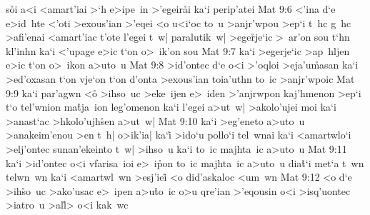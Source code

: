 s\r{o}i
a<i
<amart'iai
>`h
e>ipe~in
>'egeir\r{a}i
ka`i
perip'atei\bibvsend
\vs Mat 9:6
<'ina
d`e
e>id~hte
<'oti
>exous'ian
>'eqei
<o
u<i`oc
to~u
>anjr'wpou
>ep`i
t~hc
g~hc
>afi'enai
<amart'iac
t'ote
l'egei
t~w|
paralutik~w|
>ege\r{r}je`ic
>~ar'on
sou
t`hn
kl'inhn
ka`i
<'upage
e>ic
t`on
o>~ik'on
sou\bibvsend
\vs Mat 9:7
ka`i
>egerje`ic
>ap~hljen
e>ic
t`on
o>~ikon
a>uto~u\bibvsend
\vs Mat 9:8
>id'ontec
d`e
o<i
>'oqloi
>eja'u\r{m}asan
ka`i
>ed'oxasan
t`on
vje`on
t`on
d'onta
>exous'ian
toia'uthn
to~ic
>anjr'wpoic\bibvsend
\vs Mat 9:9
ka`i
par'agwn
<o\r{}
>ihso~uc
>eke~ijen
e>~iden
>'anjrwpon
kaj'hmenon
>ep`i
t`o
tel'wnion
ma\r{t}ja~ion
leg'omenon
ka`i
l'egei
a>ut~w|
>akolo'ujei
moi
ka`i
>anast`ac
>hkolo'ujh\r{s}en
a>ut~w|\bibvsend
\vs Mat 9:10
ka`i
>eg'eneto
a>uto~u
>anakeim'enou
>en
t~h|
o>ik'ia|
ka`i\r{}
>ido`u
pollo`i
tel~wnai
ka`i
<amartwlo`i
>elj'ontec
sunan'ekeinto
t~w|
>ihso~u
ka`i
to~ic
majhta~ic
a>uto~u\bibvsend
\vs Mat 9:11
ka`i
>id'ontec
o<i
vfarisa~ioi
e>~i\r{p}on
to~ic
majhta~ic
a>uto~u
dia\r{t}`i
met`a
t~wn
telwn~wn
ka`i
<amartwl~wn
>esj'iei\r{}
<o
did'askaloc
<um~wn\bibvsend
\vs Mat 9:12
<o
d`e
>ih\r{s}o~uc
>ako'usac
e>~ipen
a>u\r{t}o~ic
o>u
qre'ian
>'eqousin
o<i
>isq'uontec
>iatro~u
>al\r{l}>
o<i
kak~wc
